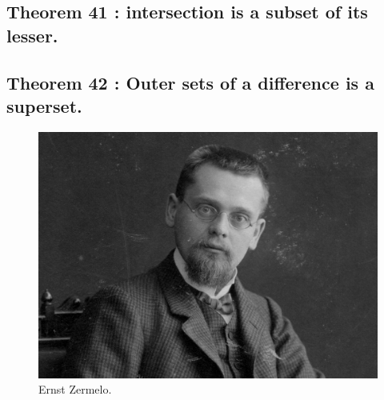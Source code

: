 \documentclass[preview]{standalone}
\begin{document}
\subsection[Intersection is a subset of its lesser.]
    {
        \color{section}Theorem 41 \color{black} : intersection is a subset of its lesser.
    }

\pagebreak


\subsection[Outermost sets in a difference is a superset.]
    {
        \color{section}Theorem 42 \color{black} : Outer sets of a difference is a superset.
    }

\vspace{1.7\baselineskip}
\begin{figure}[!h]
    \centering
    \includegraphics[width=13.5cm]{../resources/jpg/2.2.set.operations/zermelo.jpg}
    \caption*{Ernst Zermelo.}
\end{figure}
\pagebreak


\end{document}
